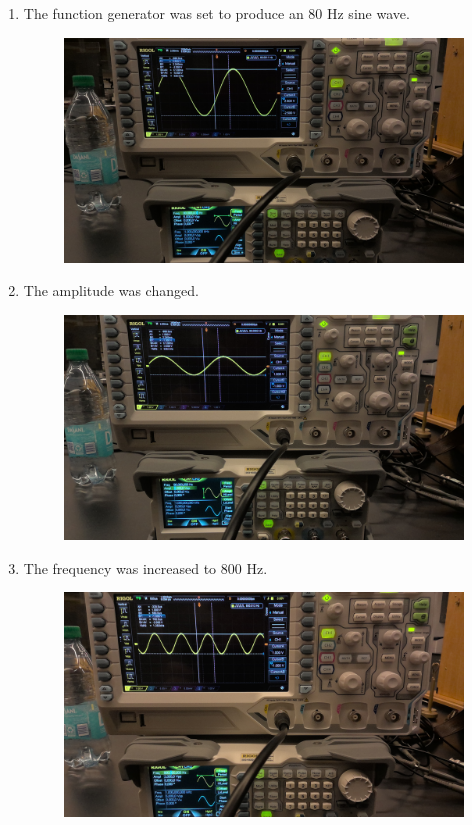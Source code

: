 \documentclass{article}
\begin{document}
            \begin{enumerate}[label=(\alph*)]
                \item The function generator was set to produce an 80 Hz sine wave.
                \begin{figure}[p]
                    \centering
                    \includegraphics[width=0.2\linewidth]{a.jpg}
                \end{figure}

                \item The amplitude was changed.
                \begin{figure}[p]
                    \centering
                    \includegraphics[width=0.2\linewidth]{b.jpg}
                \end{figure}
                
                \item The frequency was increased to 800 Hz.
                \begin{figure}[p]
                    \centering
                    \includegraphics[width=0.2\linewidth]{c.jpg}
                \end{figure}
                

\end{enumerate}
\end{document}
